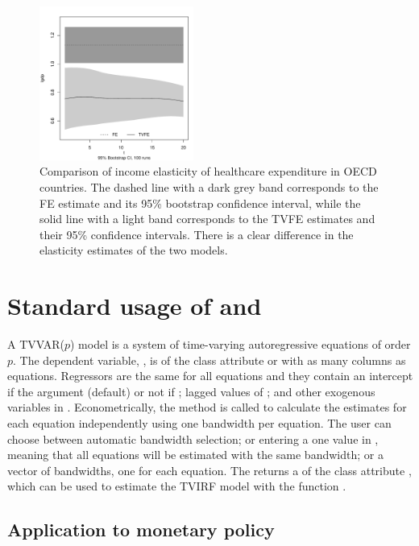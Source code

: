 \begin{figure}[!ht]
\centering
\includegraphics[width = 0.45\textwidth]{Fig3}
\caption{Comparison of income elasticity of healthcare expenditure in OECD countries. The dashed line with a dark grey band corresponds to the FE estimate and its 95\% bootstrap confidence interval, while the solid line with a light band corresponds to the TVFE estimates and their 95\% confidence intervals. There is a clear difference in the elasticity estimates of the two models. \label{fig:tvplm}}
\end{figure}


\section{Standard usage of  and }
\label{ssec:tvvar} 
A TVVAR($p$) model is a system of time-varying autoregressive equations of order $p$. The dependent variable, , is of the class attribute  or  with as many columns as equations. Regressors are the same for all equations and they contain an intercept if the argument  (default) or not if ; lagged values of ; and other exogenous variables in . Econometrically, the  method is called to calculate the estimates for each equation independently using one bandwidth per equation. The user can choose between automatic bandwidth selection; or entering a one value in , meaning that all equations will be estimated with the same bandwidth; or a vector of bandwidths, one for each equation. The  returns a  of the class attribute , which can be used to estimate the TVIRF model with the function . 

\subsection{Application to monetary policy}

